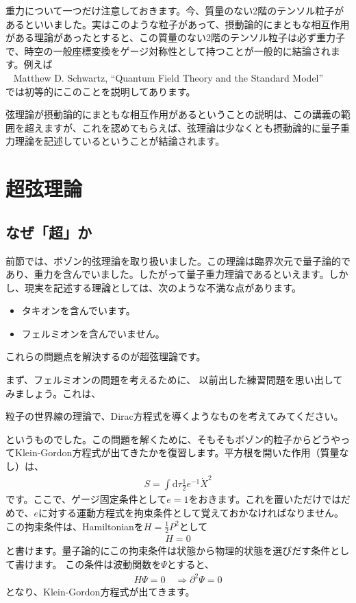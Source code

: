 \documentclass[report,paper=a4, fontsize=12pt, line_length=16cm, number_of_lines=34,dvipdfmx]{jlreq}
\newenvironment{myquote}{\begin{tcolorbox}[
  colback = blue!5, after = \noindent] }{\end{tcolorbox}}
\newenvironment{mycite}{\\ \qquad \textbullet\ }{\\}
\numberwithin{equation}{chapter}
\numberwithin{equation}{section}
\newcommand{\del}{\partial}
\newcommand{\di}{\mathrm{d}}
\begin{document}
重力について一つだけ注意しておきます。今、質量のない2階のテンソル粒子があるといいました。実はこのような粒子があって、摂動論的にまともな相互作用がある理論があったとすると、この質量のない2階のテンソル粒子は必ず重力子で、時空の一般座標変換をゲージ対称性として持つことが一般的に結論されます。例えば
\begin{mycite}
  Matthew D. Schwartz, ``Quantum Field Theory and the Standard Model''
\end{mycite}
では初等的にこのことを説明してあります。

弦理論が摂動論的にまともな相互作用があるということの説明は、この講義の範囲を超えますが、これを認めてもらえば、弦理論は少なくとも摂動論的に量子重力理論を記述しているということが結論されます。

\chapter{超弦理論}

\section{なぜ「超」か}
前節では、ボゾン的弦理論を取り扱いました。この理論は臨界次元で量子論的であり、重力を含んでいました。したがって量子重力理論であるといえます。しかし、現実を記述する理論としては、次のような不満な点があります。
\begin{itemize}
\item タキオンを含んでいます。
\item フェルミオンを含んでいません。
\end{itemize}
これらの問題点を解決するのが超弦理論です。

まず、フェルミオンの問題を考えるために、
以前出した練習問題を思い出してみましょう。これは、
\begin{myquote}
粒子の世界線の理論で、Dirac方程式を導くようなものを考えてみてください。
\end{myquote}
というものでした。この問題を解くために、そもそもボゾン的粒子からどうやってKlein-Gordon方程式が出てきたかを復習します。平方根を開いた作用（質量なし）は、
\begin{align}
S=\int \di\tau \frac12 e^{-1} \dot{X}^2
\end{align}
です。ここで、ゲージ固定条件として$e=1$をおきます。これを置いただけではだめで、$e$に対する運動方程式を拘束条件として覚えておかなければなりません。この拘束条件は、Hamiltonianを$H=\frac12 P^2$として
\begin{align}
H=0
\end{align}
と書けます。量子論的にこの拘束条件は状態から物理的状態を選びだす条件として書けます。
この条件は波動関数を$\Psi$とすると、
\begin{align}
H\Psi=0 \quad \Rightarrow \del^2 \Psi =0
\end{align}
となり、Klein-Gordon方程式が出てきます。
\end{document}
